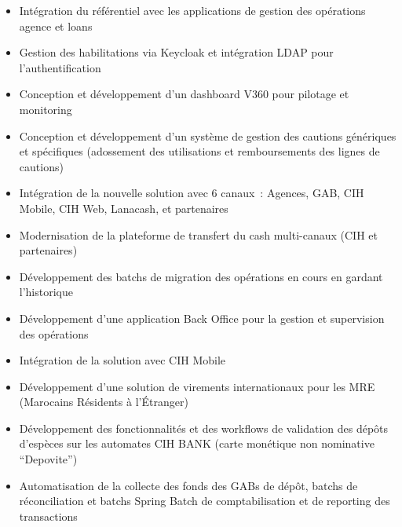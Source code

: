 \begin{itemize}
    \item Intégration du référentiel avec les applications de gestion des opérations agence et loans
    \item Gestion des habilitations via Keycloak et intégration LDAP pour l'authentification
    \item Conception et développement d'un dashboard V360 pour pilotage et monitoring
    \item Conception et développement d'un système de gestion des cautions génériques et spécifiques (adossement des utilisations et remboursements des lignes de cautions)
\end{itemize}

\begin{itemize}
    \item Intégration de la nouvelle solution avec 6 canaux~: Agences, GAB, CIH Mobile, CIH Web, Lanacash, et partenaires
    \item Modernisation de la plateforme de transfert du cash multi-canaux (CIH et partenaires)
    \item Développement des batchs de migration des opérations en cours en gardant l'historique
\end{itemize}

\begin{itemize}
    \item Développement d'une application Back Office pour la gestion et supervision des opérations
    \item Intégration de la solution avec CIH Mobile
    \item Développement d'une solution de virements internationaux pour les MRE (Marocains Résidents à l'Étranger)
\end{itemize}

\begin{itemize}
    \item Développement des fonctionnalités et des workflows de validation des dépôts d'espèces sur les automates CIH BANK (carte monétique non nominative ``Depovite'')
    \item Automatisation de la collecte des fonds des GABs de dépôt, batchs de réconciliation et batchs Spring Batch de comptabilisation et de reporting des transactions
\end{itemize}

